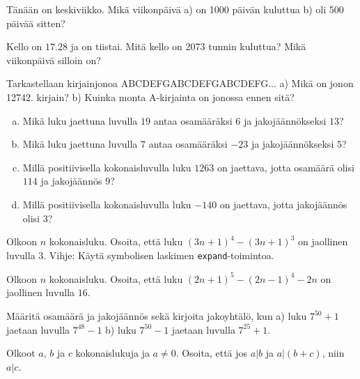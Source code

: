 \begin{kotitehtavasivu}
\begin{tehtava}
	Tänään on keskiviikko. Mikä viikonpäivä a) on 1000 päivän kuluttua b) oli 500 päivää sitten?
\end{tehtava}

\begin{tehtava}
	Kello on $17.28$ ja on tiistai. Mitä kello on 2073 tunnin kuluttua? Mikä viikonpäivä silloin on?
\end{tehtava}

\begin{tehtava}
	Tarkastellaan kirjainjonoa ABCDEFGABCDEFGABCDEFG... a) Mikä on jonon 12742. kirjain? b) Kuinka monta A-kirjainta on jonossa ennen sitä?
\end{tehtava}

\begin{tehtava}
	\begin{enumerate}[a)]
	\item Mikä luku jaettuna luvulla $19$ antaa osamääräksi $6$ ja jakojäännökseksi $13$?
	\item Mikä luku jaettuna luvulla $7$ antaa osamääräksi $-23$ ja jakojäännökseksi $5$?
	\item Millä positiivisella kokonaisluvulla luku $1263$ on jaettava, jotta osamäärä olisi $114$ ja jakojäännös $9$?
	\item Millä positiivisella kokonaisluvulla luku $-140$ on jaettava, jotta jakojäännös olisi $3$?
	\end{enumerate}
\end{tehtava}

\begin{tehtava}
	Olkoon $n$ kokonaisluku. Osoita, että luku $(3n+1)^4 - (3n+1)^3$ on jaollinen luvulla 3. Vihje: Käytä symbolisen laskimen {\tt expand}-toimintoa.
\end{tehtava}

\begin{tehtava}
	Olkoon $n$ kokonaisluku. Osoita, että luku $(2n+1)^5 - (2n-1)^4-2n$ on jaollinen luvulla $16$.
\end{tehtava}

\begin{tehtava}
	Määritä osamäärä ja jakojäännös sekä kirjoita jakoyhtälö, kun a) luku $7^{50} + 1$ jaetaan luvulla $7^{48} - 1$ b) luku $7^{50} - 1$ jaetaan luvulla $7^{25} + 1$.
\end{tehtava}

\begin{tehtava}
	Olkoot $a$, $b$ ja $c$ kokonaislukuja ja $a \neq 0$. Osoita, että jos $a|b$ ja $a|(b + c)$, niin $a|c$.
\end{tehtava}


\end{kotitehtavasivu}
